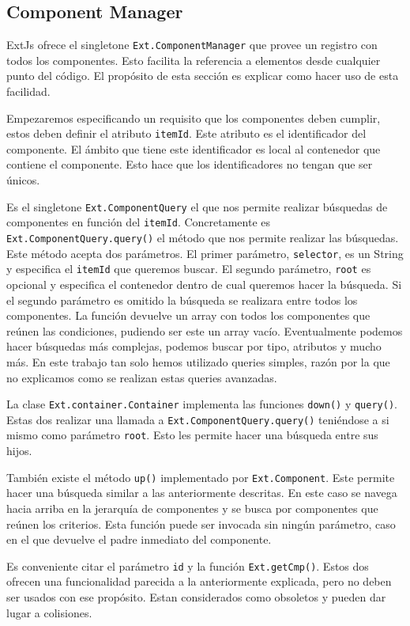 	\subsection{Component Manager}
		ExtJs ofrece el singletone \texttt{Ext.ComponentManager} que provee un registro con todos los componentes. Esto facilita la referencia
		a elementos desde cualquier punto del código. El propósito de esta sección es explicar como hacer uso de esta facilidad.
		\par
		Empezaremos especificando un requisito que  los componentes deben cumplir, estos deben definir el atributo \texttt{itemId}. Este
		atributo es el identificador del componente. El ámbito que tiene este identificador es local al contenedor que contiene el componente.
		Esto hace que los identificadores no tengan que ser únicos. 
		\par
		Es el singletone \texttt{Ext.ComponentQuery} el que nos permite realizar búsquedas de componentes en función del \texttt{itemId}.
		Concretamente es \texttt{Ext.ComponentQuery.query()} el método que nos permite realizar las búsquedas. Este método acepta dos
		parámetros. El primer parámetro, \texttt{selector}, es un String y especifica el \texttt{itemId} que queremos buscar. El segundo
		parámetro, \texttt{root} es opcional y especifica el contenedor dentro de cual queremos hacer la búsqueda. Si el segundo parámetro es
		omitido la búsqueda se realizara entre todos los componentes. La función devuelve un array con todos los componentes que reúnen las
		condiciones, pudiendo ser este un array vacío. Eventualmente podemos hacer búsquedas más complejas, podemos buscar por tipo, atributos
		y mucho más. En este trabajo tan solo hemos utilizado queries simples, razón por la que no explicamos como se realizan estas queries
		avanzadas.
		\par
		La clase \texttt{Ext.container.Container} implementa las funciones \texttt{down()} y \texttt{query()}. Estas dos realizar una llamada
		a \texttt{Ext.ComponentQuery.query()} teniéndose a si mismo como parámetro \texttt{root}. Esto les permite hacer una búsqueda entre
		sus hijos.
		\par
		También existe el método \texttt{up()} implementado por \texttt{Ext.Component}. Este permite hacer una búsqueda similar a las
		anteriormente descritas. En este caso se navega hacia arriba en la jerarquía de componentes y se busca por componentes que reúnen los
		criterios. Esta función puede ser invocada sin ningún parámetro, caso en el que devuelve el padre inmediato del componente.
		\par
		Es conveniente citar el parámetro \texttt{id} y la función \texttt{Ext.getCmp()}. Estos dos ofrecen una funcionalidad parecida a la
		anteriormente explicada, pero no deben ser usados con ese propósito. Estan considerados como obsoletos y pueden dar lugar a
		colisiones. 
